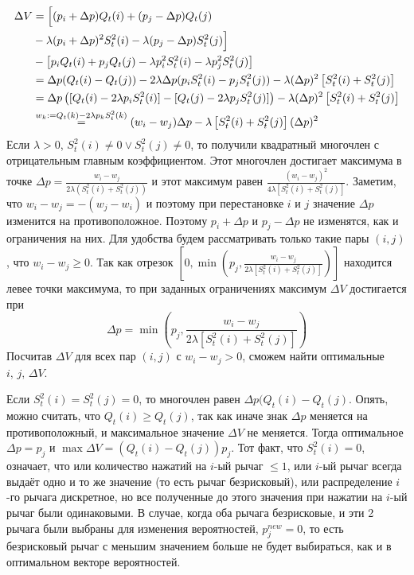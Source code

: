 \begin{equation}
\begin{split}
    \Delta V & = \Bigl[ (p_i + \Delta p) Q_t(i) + (p_j - \Delta p) Q_t(j) \\
             & - \lambda (p_i + \Delta p)^2 S_t^2(i) - \lambda (p_j - \Delta p) S_t^2(j) \Bigr] \\ 
             & - \left[  p_i Q_t(i) + p_j Q_t(j) - \lambda p_i^2 S_t^2(i) - \lambda p_j^2 S_t^2(j) \right] \\
             & = \Delta p (Q_t(i) - Q_t(j)) - 2 \lambda \Delta p (p_i S_t^2(i) - p_j S_t^2(j)) - \lambda (\Delta p)^2 \left[ S_t^2(i) + S_t^2(j) \right] \\ 
             & = \Delta p \left( [Q_t(i) - 2 \lambda p_i S_t^2(i)] - [Q_t(j) - 2 \lambda p_j S_t^2(j)]\right) - \lambda (\Delta p)^2 \left[ S_t^2(i) + S_t^2(j) \right] \\ 
             & \overset{w_k := Q_t(k) - 2 \lambda p_k S_t^2(k)}{=} (w_i - w_j) \Delta p - \lambda \left[ S_t^2(i) + S_t^2(j) \right] (\Delta p)^2
\end{split}
\end{equation}
Если $\lambda > 0$, $S_t^2(i) \neq 0 \lor S_t^2(j) \neq 0$, то получили квадратный многочлен с отрицательным главным коэффициентом. Этот многочлен достигает максимума в точке $\Delta p = \frac{w_i - w_j}{2 \lambda (S_t^2(i) + S_t^2(j))}$ и этот максимум равен $\frac{(w_i - w_j)^2}{4 \lambda \left[ S_t^2(i) + S_t^2(j) \right]}$. Заметим, что $w_i - w_j = - (w_j - w_i)$ и поэтому при перестановке $i$ и $j$ значение $\Delta p$ изменится на противоположное. Поэтому $p_i + \Delta p$ и $p_j - \Delta p$ не изменятся, как и ограничения на них. Для удобства будем рассматривать только такие пары $(i,j)$, что $w_i - w_j \geq 0$. Так как отрезок $\left[0, \min \left(p_j, \frac{w_i - w_j}{2 \lambda \left[ S_t^2(i) + S_t^2(j) \right]} \right) \right]$ находится левее точки максимума, то при заданных ограничениях максимум $\Delta V$ достигается при 
\[
\Delta p = \min \left( p_j, \frac{w_i - w_j}{2 \lambda \left[ S_t^2(i) + S_t^2(j) \right]} \right)
\]
Посчитав $\Delta V$ для всех пар $(i,j)$ с $w_i - w_j > 0$, сможем найти оптимальные $i, \, j, \, \Delta V$.

Если $S_t^2(i) = S_t^2(j) = 0$, то многочлен равен $\Delta p (Q_t(i) - Q_t(j)$. Опять, можно считать, что $Q_t(i) \geq Q_t(j)$, так как иначе знак $\Delta p$ меняется на противоположный, и максимальное значение $\Delta V$ не меняется. Тогда оптимальное $\Delta p = p_j$ и $\max \Delta V = (Q_t(i) - Q_t(j)) p_j$. Тот факт, что $S_t^2(i) = 0$, означает, что или количество нажатий на $i$-ый рычаг $ \leq 1$, или $i$-ый рычаг всегда выдаёт одно и то же значение (то есть рычаг безрисковый), или распределение $i$-го рычага дискретное, но все полученные до этого значения при нажатии на $i$-ый рычаг были одинаковыми. В случае, когда оба рычага безрисковые, и эти 2 рычага были выбраны для изменения вероятностей, $p_j^{new} = 0$, то есть безрисковый рычаг с меньшим значением больше не будет выбираться, как и в оптимальном векторе вероятностей. 

